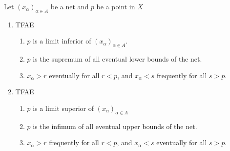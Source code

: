 \documentclass{treatise}
\begin{document}
\begin{proposition} \label{topo-ord-lim-inf-sup-event-freq}
Let $(x_\alpha)_{\alpha \in A}$ be a net and $p$ be a point in $X$
\begin{enumerate}
    \item TFAE
    \begin{enumerate}
        \item $p$ is a limit inferior of $(x_\alpha)_{\alpha \in A}$.
        \item $p$ is the supremum of all eventual lower bounds of the net.
        \item $x_\alpha > r$ eventually for all $r < p$, and $x_\alpha < s$ frequently for all $s > p$.
    \end{enumerate}
    \item TFAE
    \begin{enumerate}
        \item $p$ is a limit superior of $(x_\alpha)_{\alpha \in A}$
        \item $p$ is the infimum of all eventual upper bounds of the net.
        \item $x_\alpha > r$ frequently for all $r < p$, and $x_\alpha < s$ eventually for all $s > p$.
    \end{enumerate}
\end{enumerate}
\end{proposition}
\end{document}
